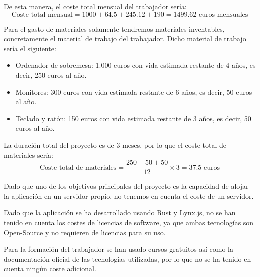 De esta manera, el coste total mensual del trabajador sería:
\begin{equation}
    \text{Coste total mensual} = 1000 + 64.5 + 245.12 + 190 = 1499.62 \text{ euros mensuales}
\end{equation}

Para el gasto de materiales solamente tendremos materiales inventables, concretamente el material de trabajo del trabajador.
Dicho material de trabajo sería el siguiente:
\begin{itemize}
    \item Ordenador de sobremesa: 1.000 euros con vida estimada restante de 4 años, es decir, 250 euros al año.
    \item Monitores: 300 euros con vida estimada restante de 6 años, es decir, 50 euros al año.
    \item Teclado y ratón: 150 euros con vida estimada restante de 3 años, es decir, 50 euros al año.
\end{itemize}
La duración total del proyecto es de 3 meses, por lo que el coste total de materiales sería:
\begin{equation}
    \text{Coste total de materiales} = \dfrac{250 + 50 + 50}{12} \times 3 = 37.5 \text{ euros}
\end{equation}

Dado que uno de los objetivos principales del proyecto es la capacidad de alojar la aplicación en un servidor propio, no tenemos en cuenta el coste de un servidor.

Dado que la aplicación se ha desarrollado usando Rust y Lynx.js, no se han tenido en cuenta los costes de licencias de software, ya que ambas tecnologías son Open-Source y no requieren de licencias para su uso.

Para la formación del trabajador se han usado cursos gratuitos así como la documentación oficial de las tecnologías utilizadas, por lo que no se ha tenido en cuenta ningún coste adicional.

